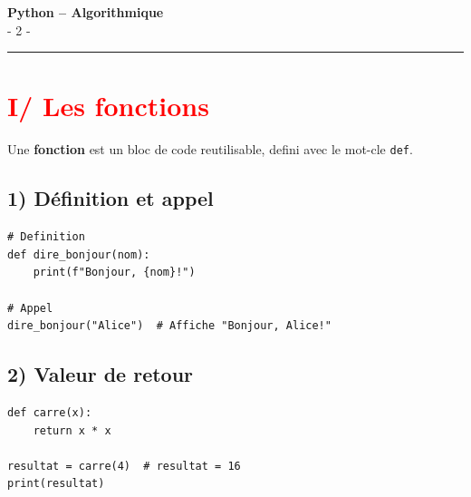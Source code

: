 \documentclass[12pt]{article}
\begin{document}
\begin{center}
    {\LARGE \textbf{Python -- Algorithmique}}\\[4mm]
    {\large - 2 -}
\end{center}

\vspace{10pt}
\hrule
\vspace{0pt}

\vspace{10pt}
\section*{\textcolor{red}{I/ Les fonctions}}
Une \textbf{fonction} est un bloc de code reutilisable, defini avec le mot-cle \texttt{def}.

\subsection*{\hspace{1cm} 1) Définition et appel}
\vspace{5pt}

\begin{lstlisting}[caption={Definition et utilisation}]
# Definition
def dire_bonjour(nom):
    print(f"Bonjour, {nom}!")

# Appel
dire_bonjour("Alice")  # Affiche "Bonjour, Alice!"
\end{lstlisting}

\subsection*{\hspace{1cm} 2) Valeur de retour}
\vspace{5pt}
\begin{lstlisting}[caption={Fonction avec retour}]
def carre(x):
    return x * x

resultat = carre(4)  # resultat = 16
print(resultat)
\end{lstlisting}
\end{document}
